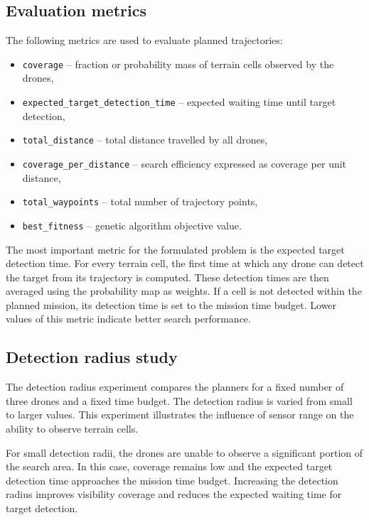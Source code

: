 \documentclass[english]{projectreport}
\begin{document}
\subsection{Evaluation metrics}

The following metrics are used to evaluate planned trajectories:
\begin{itemize}
    \item \texttt{coverage} -- fraction or probability mass of terrain cells observed by the drones,
    \item \texttt{expected\_target\_detection\_time} -- expected waiting time until target detection,
    \item \texttt{total\_distance} -- total distance travelled by all drones,
    \item \texttt{coverage\_per\_distance} -- search efficiency expressed as coverage per unit distance,
    \item \texttt{total\_waypoints} -- total number of trajectory points,
    \item \texttt{best\_fitness} -- genetic algorithm objective value.
\end{itemize}

The most important metric for the formulated problem is the expected target
detection time. For every terrain cell, the first time at which any drone can
detect the target from its trajectory is computed. These detection times are
then averaged using the probability map as weights. If a cell is not detected
within the planned mission, its detection time is set to the mission time
budget. Lower values of this metric indicate better search performance.

\subsection{Detection radius study}

The detection radius experiment compares the planners for a fixed number of
three drones and a fixed time budget. The detection radius is varied from small
to larger values. This experiment illustrates the influence of sensor range on
the ability to observe terrain cells.

For small detection radii, the drones are unable to observe a significant
portion of the search area. In this case, coverage remains low and the expected
target detection time approaches the mission time budget. Increasing the
detection radius improves visibility coverage and reduces the expected waiting
time for target detection.
\end{document}
